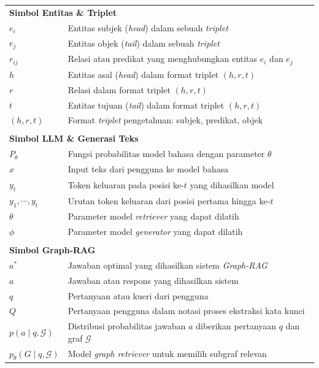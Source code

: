 \documentclass{SkripsiUnesa}
\begin{document}
\begin{longtable}{p{} p{}}
    \multicolumn{2}{l}{\textbf{Simbol Entitas \& Triplet}} \\[0.5em]
    $e_i$ & Entitas subjek (\textit{head}) dalam sebuah \textit{triplet} \\
    $e_j$ & Entitas objek (\textit{tail}) dalam sebuah \textit{triplet} \\
    $r_{ij}$ & Relasi atau predikat yang menghubungkan entitas $e_i$ dan $e_j$ \\
    $h$ & Entitas asal (\textit{head}) dalam format triplet $(h, r, t)$ \\
    $r$ & Relasi dalam format triplet $(h, r, t)$ \\
    $t$ & Entitas tujuan (\textit{tail}) dalam format triplet $(h, r, t)$ \\
    $(h, r, t)$ & Format \textit{triplet} pengetahuan: subjek, predikat, objek \\
    \\[0.5em]
    \multicolumn{2}{l}{\textbf{Simbol LLM \& Generasi Teks}} \\[0.5em]
    $P_\theta$ & Fungsi probabilitas model bahasa dengan parameter $\theta$ \\
    $x$ & Input teks dari pengguna ke model bahasa \\
    $y_t$ & Token keluaran pada posisi ke-$t$ yang dihasilkan model \\
    $y_1, \cdots, y_t$ & Urutan token keluaran dari posisi pertama hingga ke-$t$ \\
    $\theta$ & Parameter model \textit{retriever} yang dapat dilatih \\
    $\phi$ & Parameter model \textit{generator} yang dapat dilatih \\
    \\[0.5em]
    \multicolumn{2}{l}{\textbf{Simbol Graph-RAG}} \\[0.5em]
    $a^*$ & Jawaban optimal yang dihasilkan sistem \textit{Graph-RAG} \\
    $a$ & Jawaban atau respons yang dihasilkan sistem \\
    $q$ & Pertanyaan atau kueri dari pengguna \\
    $Q$ & Pertanyaan pengguna dalam notasi proses ekstraksi kata kunci \\
    $p(a \mid q, \mathcal{G})$ & Distribusi probabilitas jawaban $a$ diberikan pertanyaan $q$ dan graf $\mathcal{G}$ \\
    $p_\theta(G \mid q, \mathcal{G})$ & Model \textit{graph retriever} untuk memilih subgraf relevan \\

\end{longtable}
\end{document}
